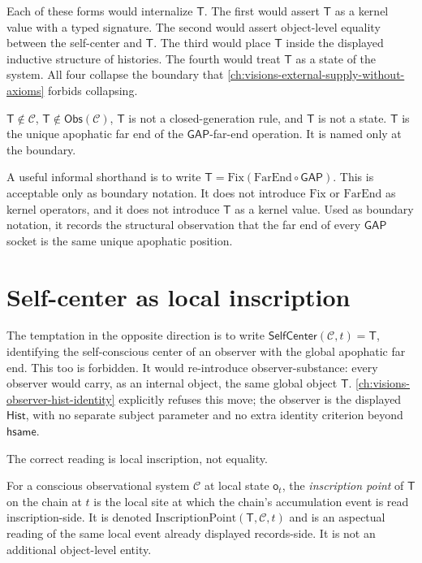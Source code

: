 Each of these forms would internalize $\mathsf{T}$. The first would assert $\mathsf{T}$ as a kernel value with a typed signature. The second would assert object-level equality between the self-center and $\mathsf{T}$. The third would place $\mathsf{T}$ inside the displayed inductive structure of histories. The fourth would treat $\mathsf{T}$ as a state of the system. All four collapse the boundary that \autoref{ch:visions-external-supply-without-axioms} forbids collapsing.

\begin{principle}
\label{prin:apophatic-fixed-point-T-not-kernel}
$\mathsf{T} \notin \mathcal{C}$, $\mathsf{T} \notin \mathsf{Obs}(\mathcal{C})$, $\mathsf{T}$ is not a closed-generation rule, and $\mathsf{T}$ is not a state. $\mathsf{T}$ is the unique apophatic far end of the $\mathsf{GAP}$-far-end operation. It is named only at the boundary.
\end{principle}

A useful informal shorthand is to write $\mathsf{T} = \mathrm{Fix}(\mathrm{FarEnd} \circ \mathsf{GAP})$. This is acceptable only as boundary notation. It does not introduce $\mathrm{Fix}$ or $\mathrm{FarEnd}$ as kernel operators, and it does not introduce $\mathsf{T}$ as a kernel value. Used as boundary notation, it records the structural observation that the far end of every $\mathsf{GAP}$ socket is the same unique apophatic position.

\section{Self-center as local inscription}
\label{sec:apophatic-fixed-point-self-center-local}

The temptation in the opposite direction is to write $\mathsf{SelfCenter}(\mathcal{C}, t) = \mathsf{T}$, identifying the self-conscious center of an observer with the global apophatic far end. This too is forbidden. It would re-introduce observer-substance: every observer would carry, as an internal object, the same global object $\mathsf{T}$. \autoref{ch:visions-observer-hist-identity} explicitly refuses this move; the observer is the displayed $\mathsf{Hist}$, with no separate subject parameter and no extra identity criterion beyond $\mathsf{hsame}$.

The correct reading is local inscription, not equality.

\begin{definition}
\label{def:apophatic-fixed-point-inscription-point}
For a conscious observational system $\mathcal{C}$ at local state $\mathsf{o}_t$, the \emph{inscription point} of $\mathsf{T}$ on the chain at $t$ is the local site at which the chain's accumulation event is read inscription-side. It is denoted $\mathrm{InscriptionPoint}(\mathsf{T}, \mathcal{C}, t)$ and is an aspectual reading of the same local event already displayed records-side. It is not an additional object-level entity.
\end{definition}

